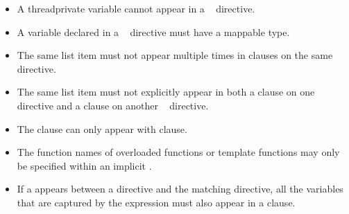 \restrictions
\begin{itemize}
\item A threadprivate variable cannot appear in a
      ~ directive.
\item A variable declared in a ~ directive
      must have a mappable type.
\item The same list item must not appear multiple times in clauses on 
      the same directive.
\item The same list item must not explicitly appear in both a  clause on one
      ~ directive and a  clause on
      another ~ directive.
\item The  clause can only appear with  clause.
\end{itemize}

\begin{cppspecific}
\begin{itemize}
\item The function names of overloaded functions or template functions
      may only be specified within an implicit .
\item If a  appears between a
       directive and the matching 
      directive, all the variables that are captured by the  expression
      must also appear in a  clause.
\end{itemize}
\end{cppspecific}

